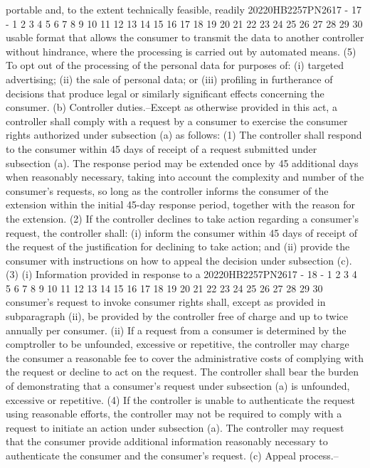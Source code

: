 portable and, to the extent technically feasible, readily
20220HB2257PN2617 - 17 -
1
2
3
4
5
6
7
8
9
10
11
12
13
14
15
16
17
18
19
20
21
22
23
24
25
26
27
28
29
30
usable format that allows the consumer to transmit the data
to another controller without hindrance, where the processing
is carried out by automated means.
(5) To opt out of the processing of the personal data
for purposes of:
(i) targeted advertising;
(ii) the sale of personal data; or
(iii) profiling in furtherance of decisions that
produce legal or similarly significant effects concerning
the consumer.
(b) Controller duties.--Except as otherwise provided in this
act, a controller shall comply with a request by a consumer to
exercise the consumer rights authorized under subsection (a) as
follows:
(1) The controller shall respond to the consumer within
45 days of receipt of a request submitted under subsection
(a). The response period may be extended once by 45
additional days when reasonably necessary, taking into
account the complexity and number of the consumer's requests,
so long as the controller informs the consumer of the
extension within the initial 45-day response period, together
with the reason for the extension.
(2) If the controller declines to take action regarding
a consumer's request, the controller shall:
(i) inform the consumer within 45 days of receipt of
the request of the justification for declining to take
action; and
(ii) provide the consumer with instructions on how
to appeal the decision under subsection (c).
(3) (i) Information provided in response to a
20220HB2257PN2617 - 18 -
1
2
3
4
5
6
7
8
9
10
11
12
13
14
15
16
17
18
19
20
21
22
23
24
25
26
27
28
29
30
consumer's request to invoke consumer rights shall,
except as provided in subparagraph (ii), be provided by
the controller free of charge and up to twice annually
per consumer.
(ii) If a request from a consumer is determined by
the comptroller to be unfounded, excessive or repetitive,
the controller may charge the consumer a reasonable fee
to cover the administrative costs of complying with the
request or decline to act on the request. The controller
shall bear the burden of demonstrating that a consumer's
request under subsection (a) is unfounded, excessive or
repetitive.
(4) If the controller is unable to authenticate the
request using reasonable efforts, the controller may not be
required to comply with a request to initiate an action under
subsection (a). The controller may request that the consumer
provide additional information reasonably necessary to
authenticate the consumer and the consumer's request.
(c) Appeal process.--
